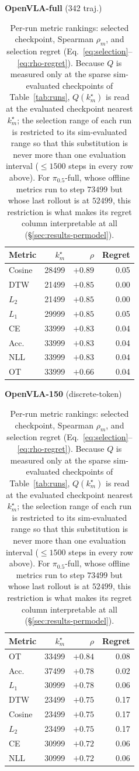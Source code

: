 \documentclass[english,12pt,a4paper,pdftex,elec,utf8]{aaltothesis}
\begin{document}
\begin{table}[h]
\centering
\caption{Per-run metric rankings: selected checkpoint, Spearman $\rho_m$, and selection regret
(Eq.~\ref{eq:selection}--\ref{eq:rho-regret}). Because $Q$ is measured only at the sparse
sim-evaluated checkpoints of Table~\ref{tab:runs}, $Q(k_m^\star)$ is read at the evaluated
checkpoint nearest $k_m^\star$; the selection range of each run is restricted to its
sim-evaluated range so that this substitution is never more than one evaluation interval
($\le1500$ steps in every row above). For $\pi_{0.5}$-full, whose offline metrics run to step
$73499$ but whose last rollout is at $52499$, this restriction is what makes its regret column
interpretable at all (\S\ref{sec:results-permodel}).}
\label{tab:rankings}
\begin{minipage}[t]{0.48\textwidth}
\centering \textbf{OpenVLA-full} (342 traj.)\\[2pt]
\begin{tabular}{lrrr}
\toprule
Metric & $k_m^\star$ & $\rho$ & Regret \\ \midrule
Cosine & 28499 & $+0.89$ & 0.05 \\
DTW    & 21499 & $+0.85$ & 0.00 \\
$L_2$  & 21499 & $+0.85$ & 0.00 \\
$L_1$  & 29999 & $+0.85$ & 0.05 \\
CE     & 33999 & $+0.83$ & 0.04 \\
Acc.   & 33999 & $+0.83$ & 0.04 \\
NLL    & 33999 & $+0.83$ & 0.04 \\
OT     & 33999 & $+0.66$ & 0.04 \\
\bottomrule
\end{tabular}
\end{minipage}
\hfill
\begin{minipage}[t]{0.48\textwidth}
\centering \textbf{OpenVLA-150} (discrete-token)\\[2pt]
\begin{tabular}{lrrr}
\toprule
Metric & $k_m^\star$ & $\rho$ & Regret \\ \midrule
OT     & 33499 & $+0.84$ & 0.08 \\
Acc.   & 37499 & $+0.78$ & 0.02 \\
$L_1$  & 30999 & $+0.78$ & 0.06 \\
DTW    & 23499 & $+0.75$ & 0.17 \\
Cosine & 23499 & $+0.75$ & 0.17 \\
$L_2$  & 23499 & $+0.75$ & 0.17 \\
CE     & 30999 & $+0.72$ & 0.06 \\
NLL    & 30999 & $+0.72$ & 0.06 \\
\bottomrule
\end{tabular}
\end{minipage}


\end{table}
\end{document}
